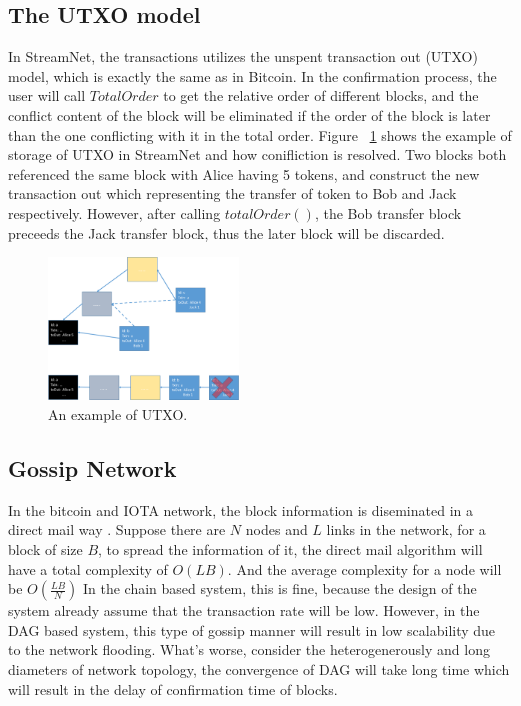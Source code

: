 \subsection{The UTXO model}

In StreamNet, the transactions utilizes the unspent transaction out (UTXO) model, which is exactly the same as in Bitcoin.
In the confirmation process, the user will call $TotalOrder$ to get the relative order of different blocks, 
and the conflict content of the block will be eliminated if the order of the block is later than the one conflicting with it in the total order.
Figure ~\ref{utxo} shows the example of storage of UTXO in StreamNet and how conifliction is resolved.
Two blocks both referenced the same block with Alice having 5 tokens, and construct the new transaction out which representing the transfer of token to Bob and Jack respectively.
However, after calling $totalOrder()$, the Bob transfer block preceeds the Jack transfer block, thus the later block will be discarded.

\begin{figure}[!ht]
\begin{center}
\includegraphics[width=0.45\textwidth]{figures/utxo.pdf}
    \caption{
        An example of UTXO.
     }
\label{utxo}
\end{center}
\end{figure}

\subsection{Gossip Network}
In the bitcoin and IOTA network, the block information is diseminated in a direct mail way \cite{demers1988epidemic}.
Suppose there are $N$ nodes and $L$ links in the network, for a block of size $B$,
to spread the information of it, the direct mail algorithm will have a total complexity of $O(LB)$.
And the average complexity for a node will be $O(\frac{LB}{N})$
In the chain based system, this is fine, because the design of the system already assume that the transaction rate will be low.
However, in the DAG based system, this type of gossip manner will result in low scalability due to the network flooding.
What's worse, consider the heterogenerously and long diameters of network topology, the convergence of DAG will take long time which will result in the delay of confirmation time of blocks.

